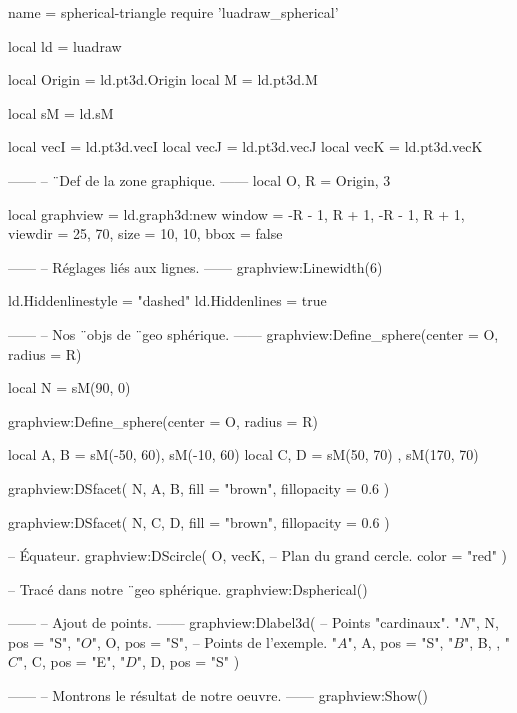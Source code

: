\documentclass[border = 3pt]{standalone}
\begin{document}
\begin{luadraw*}{name = spherical-triangle}
require 'luadraw_spherical'

local ld = luadraw

local Origin = ld.pt3d.Origin
local M      = ld.pt3d.M

local sM = ld.sM

local vecI = ld.pt3d.vecI
local vecJ = ld.pt3d.vecJ
local vecK = ld.pt3d.vecK

------
-- ¨Def de la zone graphique.
------
local O, R = Origin, 3

local graphview = ld.graph3d:new{
  window  = {-R - 1, R + 1, -R - 1, R + 1},
  viewdir = {25, 70},
  size    = {10, 10},
  bbox    = false
}

------
-- Réglages liés aux lignes.
------
graphview:Linewidth(6)

ld.Hiddenlinestyle = "dashed"
ld.Hiddenlines     = true

------
-- Nos ¨objs de ¨geo sphérique.
------
graphview:Define_sphere({center = O, radius = R})

local N = sM(90, 0)

graphview:Define_sphere({center = O, radius = R})

local A, B = sM(-50, 60), sM(-10, 60)
local C, D = sM(50, 70) , sM(170, 70)

graphview:DSfacet(
  {N, A, B},
  {fill = "brown", fillopacity = 0.6}
)

graphview:DSfacet(
  {N, C, D},
  {fill = "brown", fillopacity = 0.6}
)

-- Équateur.
graphview:DScircle(
  {O, vecK},       -- Plan du grand cercle.
  {color = "red"}
)

-- Tracé dans notre ¨geo sphérique.
graphview:Dspherical()

------
-- Ajout de points.
------
graphview:Dlabel3d(
-- Points "cardinaux".
  "$N$", N, {pos = "S"},
  "$O$", O, {pos = "S"},
-- Points de l'exemple.
  "$A$", A, {pos = "S"},
  "$B$", B, {},
  "$C$", C, {pos = "E"},
  "$D$", D, {pos = "S"}
)

------
-- Montrons le résultat de notre oeuvre.
------
graphview:Show()
\end{luadraw*}
\end{document}
